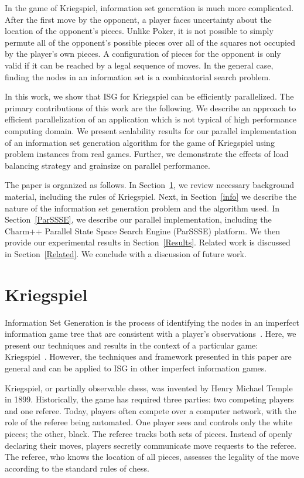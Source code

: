 \documentclass[10pt, conference, compsocconf]{IEEEtran}
\begin{document}
In the game of Kriegspiel, information set generation is much more complicated.
After the first move by the opponent, a player faces uncertainty about the
location of the opponent's pieces.  Unlike Poker, it is not possible to simply
permute all of the opponent's possible pieces over all of the squares not
occupied by the player's own pieces.  A configuration of pieces for the
opponent is only valid if it can be reached by a legal sequence of moves.  In
the general case, finding the nodes in an information set is a combinatorial
search problem.

In this work, we show that ISG for Kriegspiel can be efficiently parallelized.
The primary contributions of this work are the following. We describe an
approach to efficient parallelization of an application which is not typical of
high performance computing domain. We present scalability results for our
parallel implementation of an information set generation algorithm for the game
of Kriegspiel using problem instances from real games. Further, we demonstrate
the effects of load balancing strategy and grainsize on parallel performance. 

The paper is organized as follows.  In Section~\ref{Kriegspiel}, we review
necessary background material, including the rules of Kriegspiel. Next, in
Section~\ref{info} we describe the nature of the information set generation
problem and the algorithm used.  In Section~\ref{ParSSSE}, we describe our
parallel implementation, including the {\sc Charm++} Parallel State Space
Search Engine (ParSSSE) platform.  We then provide our experimental results in
Section~\ref{Results}.  Related work is discussed in Section~\ref{Related}.  We
conclude with a discussion of future work.


\section{Kriegspiel}\label{Kriegspiel}
Information Set Generation is the process of identifying the nodes in an
imperfect information game tree that are consistent with a player's
observations~\cite{richards12information}. Here, we present our techniques and
results in the context of a particular game: Kriegspiel~\cite{li94chess}.
However, the techniques and framework presented in this paper are general and
can be applied to ISG in other imperfect information games.

Kriegspiel, or partially observable chess,  was invented by Henry Michael
Temple in 1899.  Historically, the game has required three parties: two
competing players and one referee.  Today, players often compete over a
computer network, with the role of the referee being automated.  One player
sees and controls only the white pieces; the other, black.  The referee tracks
both sets of pieces.  Instead of openly declaring their moves, players secretly
communicate move requests to the referee.  The referee, who knows the location
of all pieces, assesses the legality of the move according to the standard
rules of chess.  
\end{document}
